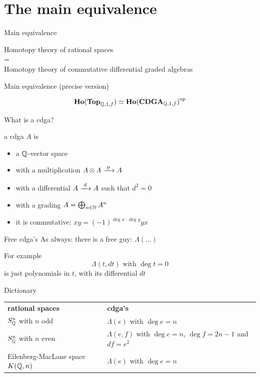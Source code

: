 \documentclass[14pt]{beamer}
\newcommand{\Frame}[2]{
	\begin{frame}{#1}#2\end{frame}
}
\begin{document}
\section{The main equivalence}
\Frame{Main equivalence}{
	\begin{theorem}
	\begin{center}
		Homotopy theory of rational spaces \\
		= \\
		Homotopy theory of commutative differential graded algebras
	\end{center}
	\end{theorem}
}

\Frame{Main equivalence (precise version)}{
	\begin{theorem}
		\[ \mathbf{Ho}(\mathbf{Top}_{\mathbb{Q}, 1, f}) \simeq {\mathbf{Ho}(\mathbf{CDGA}_{\mathbb{Q}, 1, f})}^{\text{op}} \]
	\end{theorem}
}

\Frame{What is a cdga?}{
	\begin{definition}
		a cdga $A$ is
		\begin{itemize}
			\item a $\mathbb{Q}$-vector space
			\item with a multiplication $A \operatorname*{\otimes} A \xrightarrow{\,\,{\mu}\,\,} A$
			\item with a differential $A \xrightarrow{\,\,{d}\,\,} A$ such that $d^2 = 0$
			\item with a grading $A = \bigoplus_{n \in \mathbb{N}} A^n$
			\item it is commutative: $ x y = (-1)^{\deg{x}\cdot\deg{y}} y x $
		\end{itemize}
	\end{definition}
}

\Frame{Free cdga's}{
	As always: there is a free guy: $\Lambda(...)$

	For example
	\[ \Lambda(t, dt) \text{ with } \deg{t} = 0 \]
	is just polynomials in $t$, with its differential $dt$
}

\newcommand{\Dict}[1]{
	\noindent
	\begin{tabularx}{\textwidth}{ X X }
		{\bf rational spaces} & {\bf cdga's} \\[1em]
		#1
	\end{tabularx}
}

\Frame{Dictionary}{
	\Dict{
		$S^n_{\mathbb{Q}}$ with $n$ odd
				& $\Lambda(e)$ with $\deg{e} = n$ \\[1em]

		$S^n_{\mathbb{Q}}$ with $n$ even
				& $\Lambda(e, f)$ with $\deg{e} = n$, $\deg{f} = 2n-1$ and $d f = e^2$ \\[1em]

		Eilenberg-MacLane space $K(\mathbb{Q}, n)$
				& $\Lambda(e)$ with $\deg{e} = n$
	}
}
\end{document}

